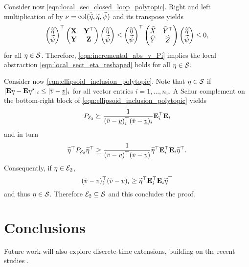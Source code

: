 \documentclass{ifacconf}
\begin{document}
Consider now \eqref{eqn:local_sec_closed_loop_polytopic}. Right and left multiplication  of  by $\nu = \operatorname{col}(\dot{\widetilde \eta}, \widetilde \eta, \widetilde \psi)$ and its transpose 
yields
\[
\left(\begin{matrix}\widetilde \eta\\\widetilde \psi\end{matrix}\right)^\top\left(\begin{matrix}{\bf{X}} & {\bf{Y}}^\top\\{\bf{Y}}&{\bf{Z}}\end{matrix}\right)\left(\begin{matrix}\widetilde \eta\\\widetilde \psi\end{matrix}\right)\le \left(\begin{matrix}\widetilde \eta\\\widetilde \psi\end{matrix}\right)^\top\left(\begin{matrix}\widehat X & \widehat Y^\top\\\widehat Y&\widehat Z\end{matrix}\right)\left(\begin{matrix}\widetilde \eta\\\widetilde \psi\end{matrix}\right)\le 0,
\]
for all $\eta\in{\mathcal{S}}$. 
Therefore, \eqref{eqn:incremental_abs_v_Pi} implies the local abstraction \eqref{eqn:local_sect_eta_reshaped} holds for all $\eta\in{\mathcal{S}}$. 

Consider now \eqref{eqn:ellipsoid_inclusion_polytopic}.
Note that $\eta\in{\mathcal{S}}$ if $|{\bf{E}}\eta-{\bf{E}}\eta^\star|_i \le |\overline v -\underline v|_i$ for all vector entries $i=1,\dots,n_v$. A Schur complement on the bottom-right block of \eqref{eqn:ellipsoid_inclusion_polytopic} yields
\[
P_{\cE_2}\succeq \frac{1}{(\overbar v -\underline v)_i^\top  (\overbar v -\underline v)_i}\bE_i^\top \bE_i
\]
and in turn
\[
\widetilde \eta^\top P_{\cE_2} \widetilde \eta^\top\ge \frac{1}{(\overbar v -\underline v)^\top  (\overbar v -\underline v)} \widetilde \eta^\top\bE_i^\top \bE_i\widetilde \eta^\top.
\]
 Consequently, if $\eta\in{\mathcal{E}}_2$, 
 \[
(\overbar v -\underline v)_i^\top  (\overbar v -\underline v)_i \ge \widetilde \eta^\top\bE_i^\top \bE_i\widetilde \eta^\top
\]
and thus $\eta\in{\mathcal{S}}$. Therefore ${\mathcal{E}}_2\subseteq {\mathcal{S}}$ and this concludes the proof.
\section{Conclusions}
Future work will also explore discrete-time extensions, building on the recent studies \citep{zoboli2024k}.


\end{document}
